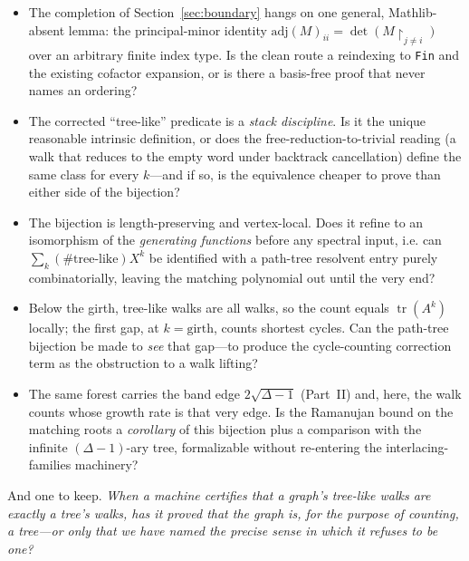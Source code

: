 \documentclass[11pt]{article}
\newcommand{\lean}[1]{\texttt{#1}}
\DeclareMathOperator{\tr}{tr}
\begin{document}
\begin{itemize}
\item The completion of Section~\ref{sec:boundary} hangs on one general, Mathlib-absent lemma:
the principal-minor identity $\mathrm{adj}(M)_{ii}=\det(M\!\restriction_{j\neq i})$ over an arbitrary
finite index type. Is the clean route a reindexing to \lean{Fin} and the existing cofactor expansion,
or is there a basis-free proof that never names an ordering?
\item The corrected ``tree-like'' predicate is a \emph{stack discipline}. Is it the unique reasonable
intrinsic definition, or does the free-reduction-to-trivial reading (a walk that reduces to the empty
word under backtrack cancellation) define the same class for every $k$---and if so, is the
equivalence cheaper to prove than either side of the bijection?
\item The bijection is length-preserving and vertex-local. Does it refine to an isomorphism of the
\emph{generating functions} before any spectral input, i.e. can $\sum_k(\#\text{tree-like})X^k$ be
identified with a path-tree resolvent entry purely combinatorially, leaving the matching polynomial
out until the very end?
\item Below the girth, tree-like walks are all walks, so the count equals $\tr(A^k)$ locally; the
first gap, at $k=\text{girth}$, counts shortest cycles. Can the path-tree bijection be made to
\emph{see} that gap---to produce the cycle-counting correction term as the obstruction to a walk
lifting?
\item The same forest carries the band edge $2\sqrt{\Delta-1}$ (Part~II) and, here, the walk counts
whose growth rate is that very edge. Is the Ramanujan bound on the matching roots a \emph{corollary}
of this bijection plus a comparison with the infinite $(\Delta-1)$-ary tree, formalizable without
re-entering the interlacing-families machinery?
\end{itemize}

And one to keep. \emph{When a machine certifies that a graph's tree-like walks are exactly a tree's
walks, has it proved that the graph is, for the purpose of counting, a tree---or only that we have
named the precise sense in which it refuses to be one?}
\end{document}
